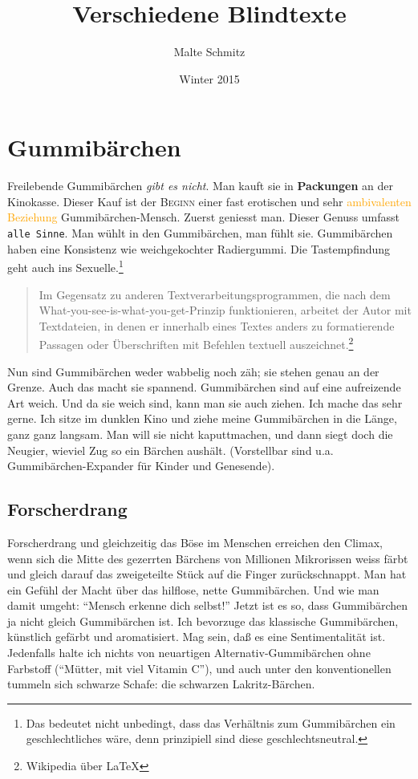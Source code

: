 \documentclass{scrartcl}
\begin{document}
  \title{Verschiedene Blindtexte}
  \author{Malte Schmitz}
  \date{Winter 2015}
  \maketitle

  \tableofcontents

  \section{Gummibärchen}

  Freilebende Gummibärchen \emph{gibt es nicht}. Man kauft sie in \textbf{Packungen} an der Kinokasse. Dieser Kauf ist der \textsc{Beginn} einer fast erotischen und sehr \textcolor{orange}{ambivalenten Beziehung} Gummibärchen-Mensch. Zuerst geniesst man. Dieser Genuss umfasst \texttt{alle Sinne}. Man wühlt in den Gummibärchen, man fühlt sie. Gummibärchen haben eine Konsistenz wie weichgekochter Radiergummi. Die Tastempfindung geht auch ins Sexuelle.\footnote{Das bedeutet nicht unbedingt, dass das Verhältnis zum Gummibärchen ein geschlechtliches wäre, denn prinzipiell sind diese geschlechtsneutral.}

  \begin{quote}
    Im Gegensatz zu anderen Textverarbeitungsprogrammen, die nach dem What-you-see-is-what-you-get-Prinzip funktionieren, arbeitet der Autor mit Textdateien, in denen er innerhalb eines Textes anders zu formatierende Passagen oder Überschriften mit Befehlen textuell auszeichnet.\footnote{Wikipedia über LaTeX}
  \end{quote}

  Nun sind Gummibärchen weder wabbelig noch zäh; sie stehen genau an der Grenze. Auch das macht sie spannend. Gummibärchen sind auf eine aufreizende Art weich. Und da sie weich sind, kann man sie auch ziehen. Ich mache das sehr gerne. Ich sitze im dunklen Kino und ziehe meine Gummibärchen in die Länge, ganz ganz langsam. Man will sie nicht kaputtmachen, und dann siegt doch die Neugier, wieviel Zug so ein Bärchen aushält. (Vorstellbar sind u.a. Gummibärchen-Expander für Kinder und Genesende).

  \subsection{Forscherdrang}

  Forscherdrang und gleichzeitig das Böse im Menschen erreichen den Climax, wenn sich die Mitte des gezerrten Bärchens von Millionen Mikrorissen weiss färbt und gleich darauf das zweigeteilte Stück auf die Finger zurückschnappt. Man hat ein Gefühl der Macht über das hilflose, nette Gummibärchen. Und wie man damit umgeht: \enquote{Mensch erkenne dich selbst!} Jetzt ist es so, dass Gummibärchen ja nicht gleich Gummibärchen ist. Ich bevorzuge das klassische Gummibärchen, künstlich gefärbt und aromatisiert. Mag sein, daß es eine Sentimentalität ist. Jedenfalls halte ich nichts von neuartigen Alternativ-Gummibärchen ohne Farbstoff (\enquote{Mütter, mit viel Vitamin C}), und auch unter den konventionellen tummeln sich schwarze Schafe: die schwarzen Lakritz-Bärchen.
\end{document}
